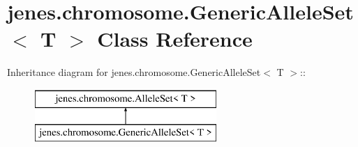 \hypertarget{classjenes_1_1chromosome_1_1_generic_allele_set_3_01_t_01_4}{
\section{jenes.chromosome.GenericAlleleSet$<$ T $>$ Class Reference}
\label{classjenes_1_1chromosome_1_1_generic_allele_set_3_01_t_01_4}
}
Inheritance diagram for jenes.chromosome.GenericAlleleSet$<$ T $>$::\begin{figure}[H]
\begin{center}
\leavevmode
\includegraphics[height=2cm]{classjenes_1_1chromosome_1_1_generic_allele_set_3_01_t_01_4}
\end{center}
\end{figure}
